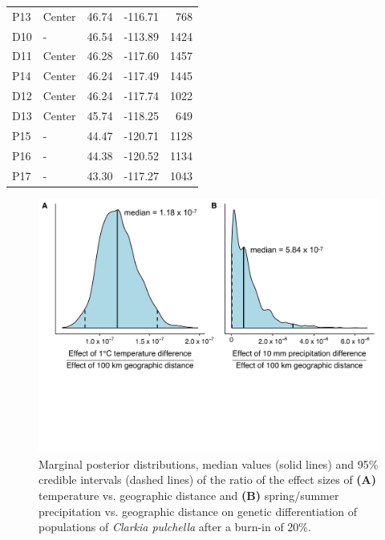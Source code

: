 \documentclass{article}
\begin{document}
\begin{table}[p]
\begin{tabular}{llrrr}
P13 &	Center  &	46.74 &	-116.71 &	768  \\
D10 &	-       &	46.54 &	-113.89 &	1424 \\
D11 &	Center  &	46.28 &	-117.60 &	1457 \\
P14 &	Center  &	46.24 &	-117.49 &	1445 \\
D12 &	Center  &	46.24 &	-117.74 &	1022 \\
D13 &	Center  &	45.74 &	-118.25 &	649  \\
P15 &	-	      & 44.47 &	-120.71 &	1128 \\
P16 &	-       &	44.38 &	-120.52 &	1134 \\
P17 &	-       &	43.30 &	-117.27 &	1043 \\
\bottomrule
\end{tabular}
\end{table}


\begin{figure}[p]
\centering
\includegraphics[width=14cm]{figs/bedassle_main.pdf}
\caption[Effect sizes of temperature and precipitation vs. geographic distance]{Marginal posterior distributions, median values (solid lines) and 95\% credible intervals (dashed lines) of the ratio of the effect sizes of \textbf{(A)} temperature vs. geographic distance and \textbf{(B)} spring/summer precipitation vs. geographic distance on genetic differentiation of populations of \textit{Clarkia pulchella} after a burn-in of 20\%.}
\label{bedassle_main}
\end{figure}
\end{document}
